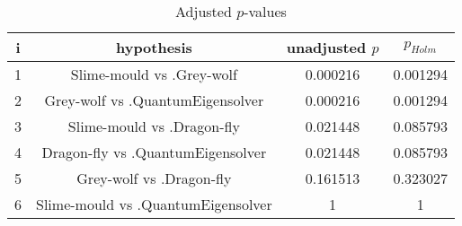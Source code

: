 \documentclass[a4paper,10pt]{article}
\begin{document}
\begin{landscape}
\begin{table}[!htp]
\centering\scriptsize
\begin{tabular}{cccc}
i&hypothesis&unadjusted $p$&$p_{Holm}$\\
\hline1&Slime-mould vs .Grey-wolf&0.000216&0.001294\\
2&Grey-wolf vs .QuantumEigensolver&0.000216&0.001294\\
3&Slime-mould vs .Dragon-fly&0.021448&0.085793\\
4&Dragon-fly vs .QuantumEigensolver&0.021448&0.085793\\
5&Grey-wolf vs .Dragon-fly&0.161513&0.323027\\
6&Slime-mould vs .QuantumEigensolver&1&1\\
\hline
\end{tabular}
\caption{Adjusted $p$-values}
\end{table}

\end{landscape}
\end{document}
